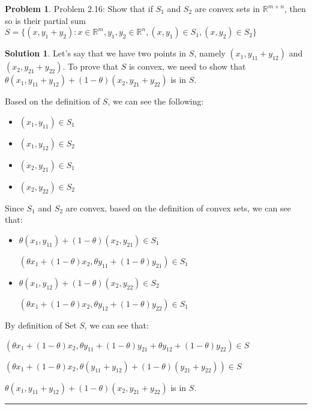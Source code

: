 \documentclass{article}
\theoremstyle{definition}
\newtheorem{problem}{Problem}
\def\fline{\rule{0.75\linewidth}{0.5pt}}
\newcommand{\finishline}{\begin{center}\fline\end{center}}
\newtheorem*{solution*}{Solution}
\newenvironment{solution}{\begin{solution*}}{{\finishline} \end{solution*}}
\begin{document}
\begin{problem}
Problem 2.16: \newline 
    Show that if $S_1$ and $S_2$ are convex sets in $\mathbb{R}^{m + n}$, then so is their partial sum \newline 
    $S = \{(x, y_1 + y_2) : x \in \mathbb{R}^m, y_1, y_2 \in \mathbb{R}^n, (x, y_1) \in S_1, (x, y_2) \in S_2 \}$

    \begin{solution}

    Let's say that we have two points in $S$, namely $(x_1, y_{11} + y_{12})$ and $(x_2, y_{21} + y_{22})$. To prove that $S$ is convex, we need to show that $\theta (x_1, y_{11} + y_{12}) + (1 - \theta) (x_2, y_{21} + y_{22})$ is in $S$.  

    Based on the definition of $S$, we can see the following: 
    \begin{itemize}
        \item $(x_1, y_{11}) \in S_1$
        \item $(x_1, y_{12}) \in S_2$
        \item $(x_2, y_{21}) \in S_1$
        \item $(x_2, y_{22}) \in S_2$
    \end{itemize}

    Since $S_1$ and $S_2$ are convex, based on the definition of convex sets, we can see that:
    \begin{itemize}
        \item $\theta (x_1, y_{11}) + (1 - \theta) (x_2, y_{21}) \in S_1$

        $ (\theta x_1 + (1 - \theta) x_2, \theta y_{11} + (1 - \theta) y_{21} ) \in S_1$
        \item $\theta (x_1, y_{12})  + (1 - \theta)(x_2, y_{22}) \in S_2$

        $ (\theta x_1 + (1 - \theta) x_2, \theta y_{12} + (1 - \theta) y_{22} ) \in S_1$
    \end{itemize}

    By definition of Set $S$, we can see that: \newline 

    $ (\theta x_1 + (1 - \theta) x_2, \theta y_{11} + (1 - \theta) y_{21} + \theta y_{12} + (1 - \theta) y_{22} ) \in S$ \newline 

        $ (\theta x_1 + (1 - \theta) x_2, \theta (y_{11} + y_{12}) + (1 - \theta) (y_{21} + y_{22}) ) \in S$ \newline 

$\theta (x_1, y_{11} + y_{12}) + (1 - \theta) (x_2, y_{21} + y_{22})$ is in $S$.  
    
        
    \end{solution}
\end{problem}
\end{document}
